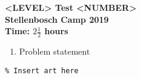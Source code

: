 \documentclass{article}
\begin{document}
\thispagestyle{empty}

\begin{center}
  \textbf{\Large <LEVEL> Test <NUMBER>}
  \\ \vspace{1em}
  \textbf{\large Stellenbosch Camp 2019}
  \\ \vspace{1em}
  \textbf{\large Time: $2\frac{1}{2}$ hours}
\end{center}


\begin{enumerate}[1.]

\item %
Problem statement

\end{enumerate}


\vfill
\begin{center} \begin{verbatim}
% Insert art here
\end{verbatim} \end{center}
\end{document}
